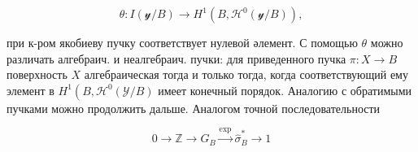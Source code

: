 \documentclass[10pt]{article}
\begin{document}
\[

\theta: I(\mathcal{y} / B) \longrightarrow H^{1}\left(B, \mathscr{H}^{0}(\mathcal{y} / B)\right),

\]



при к-ром якобиеву пучку соответствует нулевой әлемент. С помощью $\theta$ можно различать алгебраич. и неалгебраич. пучки: для приведенного пучка $\pi: X \rightarrow B$ поверхность $X$ алгебраическая тогда и только тогда, когда соответствующий ему элемент в $H^{1}\left(B, \mathscr{H}^{0}(\mathcal{Y} / B)\right.$ имеет конечный порядок. Аналогию с обратимыми пучками можно продолжить дальше. Аналогом точной последовательности



\[

0 \longrightarrow \mathbb{Z} \longrightarrow G_{B} \stackrel{\exp }{\rightarrow} \widehat{\sigma}_{B}^{*} \longrightarrow 1

\]
\end{document}
